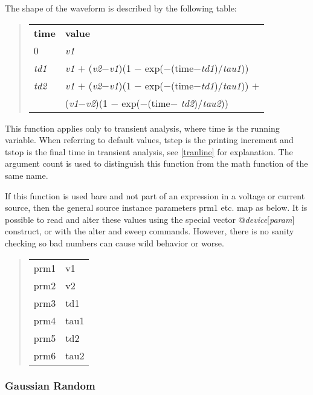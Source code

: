 The shape of the waveform is described by the following table:

\begin{quote}
\begin{tabular}{ll}
{\bf time} & {\bf value}\\[0.5ex]
0 & {\it v1\/}\\
{\it td1\/} & {\it v1\/} $+$ ({\it v2\/}$-${\it v1\/})(1 $-$
 exp($-$(time$-${\it td1\/})/{\it tau1\/}))\\
{\it td2\/} & {\it v1\/} $+$ ({\it v2\/}$-${\it v1\/})(1 $-$
exp($-$(time$-${\it td1\/})/{\it tau1\/})) $+$\\
 & ({\it v1\/}$-${\it v2\/})(1 $-$ exp($-$(time$-${\it
 td2\/})/{\it tau2\/}))\\[2ex]
\end{tabular}
\end{quote}

This function applies only to transient analysis, where time is the
running variable.  When referring to default values, {\vt tstep} is
the printing increment and {\vt tstop} is the final time in transient
analysis, see \ref{tranline} for explanation.  The argument count is
used to distinguish this function from the math function of the same
name.

If this function is used bare and not part of an expression in a
voltage or current source, then the general source instance parameters
{\vt prm1} etc.  map as below.  It is possible to read and alter these
values using the special vector @{\it device}[{\it param\/}]
construct, or with the {\cb alter} and {\cb sweep} commands.  However,
there is no sanity checking so bad numbers can cause wild behavior or
worse.

\begin{quote}
\begin{tabular}{ll}
prm1 & v1\\
prm2 & v2\\
prm3 & td1\\
prm4 & tau1\\
prm5 & td2\\
prm6 & tau2\\
\end{tabular}
\end{quote}

\subsubsection{Gaussian Random}
\label{tgauss}

